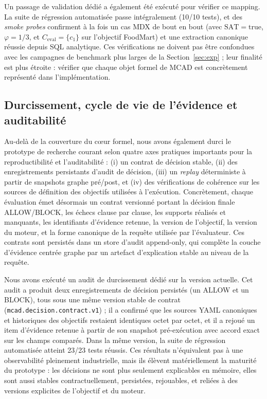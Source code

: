 \documentclass[journal]{IEEEtran}
\begin{document}
Un passage de validation dédié a également été exécuté pour vérifier ce mapping. La suite de régression automatisée passe intégralement (10/10 tests), et des \emph{smoke probes} confirment à la fois un cas MDX de bout en bout (avec $\mathrm{SAT}=\text{true}$, $\varphi=1/3$, et $C_{\mathrm{eval}}=\{c_1\}$ sur l'objectif FoodMart) et une extraction canonique réussie depuis SQL analytique. Ces vérifications ne doivent pas être confondues avec les campagnes de benchmark plus larges de la Section~\ref{sec:exp} ; leur finalité est plus étroite : vérifier que chaque objet formel de MCAD est concrètement représenté dans l'implémentation.

\subsection{Durcissement, cycle de vie de l'évidence et auditabilité}

Au-delà de la couverture du cœur formel, nous avons également durci le prototype de recherche courant selon quatre axes pratiques importants pour la reproductibilité et l'auditabilité : (i) un contrat de décision stable, (ii) des enregistrements persistants d'audit de décision, (iii) un \emph{replay} déterministe à partir de snapshots graphe pré/post, et (iv) des vérifications de cohérence sur les sources de définition des objectifs utilisées à l'exécution. Concrètement, chaque évaluation émet désormais un contrat versionné portant la décision finale ALLOW/BLOCK, les échecs clause par clause, les supports réalisés et manquants, les identifiants d'évidence retenue, la version de l'objectif, la version du moteur, et la forme canonique de la requête utilisée par l'évaluateur. Ces contrats sont persistés dans un store d'audit append-only, qui complète la couche d'évidence centrée graphe par un artefact d'explication stable au niveau de la requête.

Nous avons exécuté un audit de durcissement dédié sur la version actuelle. Cet audit a produit deux enregistrements de décision persistés (un ALLOW et un BLOCK), tous sous une même version stable de contrat (\texttt{mcad.decision.contract.v1}) ; il a confirmé que les sources YAML canoniques et historiques des objectifs restaient identiques octet par octet, et il a rejoué un item d'évidence retenue à partir de son snapshot pré-exécution avec accord exact sur les champs comparés. Dans la même version, la suite de régression automatisée atteint 23/23 tests réussis. Ces résultats n'équivalent pas à une observabilité pleinement industrielle, mais ils élèvent matériellement la maturité du prototype : les décisions ne sont plus seulement explicables en mémoire, elles sont aussi stables contractuellement, persistées, rejouables, et reliées à des versions explicites de l'objectif et du moteur.
\end{document}
